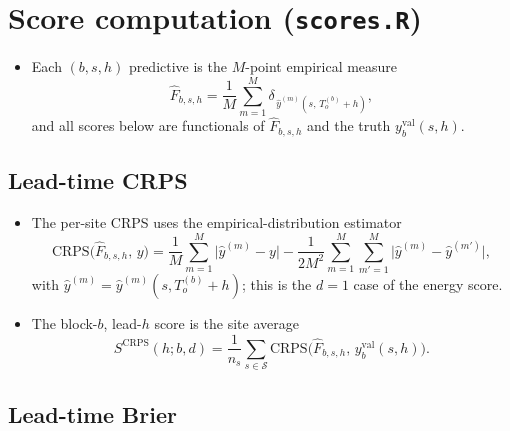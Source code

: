\documentclass[11pt]{article}
\begin{document}
\section{Score computation (\texttt{scores.R})}

\begin{itemize}[leftmargin=1.4em]
  \item Each $(b,s,h)$ predictive is the $M$-point empirical measure
        \begin{equation}
          \hat F_{b,s,h}
          = \frac1M \sum_{m=1}^M
            \delta_{\,\hat y^{(m)}(s,\,T_o^{(b)}+h)} ,
          \label{eq:empmeasure}
        \end{equation}
        and all scores below are functionals of $\hat F_{b,s,h}$ and the
        truth $y^{\mathrm{val}}_b(s,h)$.
\end{itemize}

\subsection{Lead-time CRPS}

\begin{itemize}[leftmargin=1.4em]
  \item The per-site CRPS uses the empirical-distribution estimator
        \begin{equation}
          \mathrm{CRPS}\big(\hat F_{b,s,h},\,y\big)
          = \frac1M\sum_{m=1}^M \big|\hat y^{(m)}-y\big|
          - \frac1{2M^2}\sum_{m=1}^M\sum_{m'=1}^M
            \big|\hat y^{(m)}-\hat y^{(m')}\big|,
          \label{eq:crps}
        \end{equation}
        with $\hat y^{(m)}=\hat y^{(m)}(s,T_o^{(b)}+h)$; this is the
        $d=1$ case of the energy score.
  \item The block-$b$, lead-$h$ score is the site average
        \begin{equation}
          S^{\mathrm{CRPS}}(h;b,d)
          = \frac1{n_s}\sum_{s\in\mathcal S}
            \mathrm{CRPS}\big(\hat F_{b,s,h},\,
              y^{\mathrm{val}}_b(s,h)\big).
          \label{eq:crps-block}
        \end{equation}
\end{itemize}

\subsection{Lead-time Brier}
\end{document}
